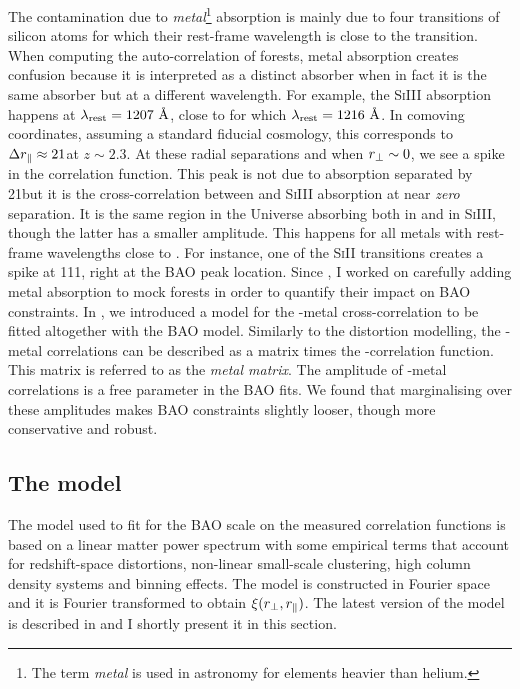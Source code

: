 The contamination due to \emph{metal}\footnote{The term \emph{metal} is used in 
astronomy for elements heavier than helium.} 
absorption is mainly due to four transitions of silicon atoms for which their 
rest-frame wavelength is close to the \lya transition. When computing the 
auto-correlation of forests, metal absorption creates confusion because 
it is interpreted as a distinct \lya absorber when in fact it is the same
absorber but at a different wavelength.
For example, the \textsc{SiIII} absorption happens at 
$\lambda_\mathrm{rest} = 1207~\angstrom$, close to \lya for which $\lambda_\mathrm{rest} = 1216~\angstrom$. 
In comoving coordinates, assuming a standard fiducial cosmology, this corresponds
to $\Delta {r_\parallel} \approx 21$\hmpc at $z \sim 2.3$. 
At these radial separations and when ${r_\perp} \sim 0$, we see a 
spike in the correlation function. 
This peak is not due to \lya absorption 
separated by 21\hmpc but it is the cross-correlation between \lya and \textsc{SiIII}
absorption at near \emph{zero} separation. 
It is the same region in the Universe absorbing both in \lya and in \textsc{SiIII}, 
though the latter has a smaller amplitude. 
This happens for all metals with rest-frame wavelengths close to \lya. 
For instance, one of the \textsc{SiII} transitions creates a spike at 111\hmpc, right at the BAO peak location. 
Since \cite{delubacBaryonAcousticOscillations2015}, I worked on carefully 
adding metal absorption to mock forests in order to quantify their impact on 
BAO constraints. In \cite{bautistaMeasurementBaryonAcoustic2017}, we introduced 
a model for the \lya-metal cross-correlation to be fitted altogether with the 
BAO model. Similarly to the distortion modelling, the \lya-metal correlations 
can be described as a matrix times the \lya-\lya correlation function. 
This matrix is referred to as the \emph{metal matrix}. The amplitude of 
\lya-metal correlations is a free parameter in the BAO fits. 
We found that marginalising over these amplitudes makes BAO constraints 
slightly looser, though more conservative and robust.   

\subsection{The model}
\label{forests:bao:model}

The model used to fit for the BAO scale on the measured correlation functions 
is based on a linear matter power spectrum with some empirical terms 
that account for redshift-space distortions, non-linear small-scale clustering, 
high column density systems and binning effects. The model is constructed in 
Fourier space and it is Fourier transformed to obtain $\xi({r_\perp}, {r_\parallel})$. 
The latest version of the model is described in \cite{dumasdesbourbouxhelionCompletedSDSSIVExtended2020}
and I shortly present it in this section. 

